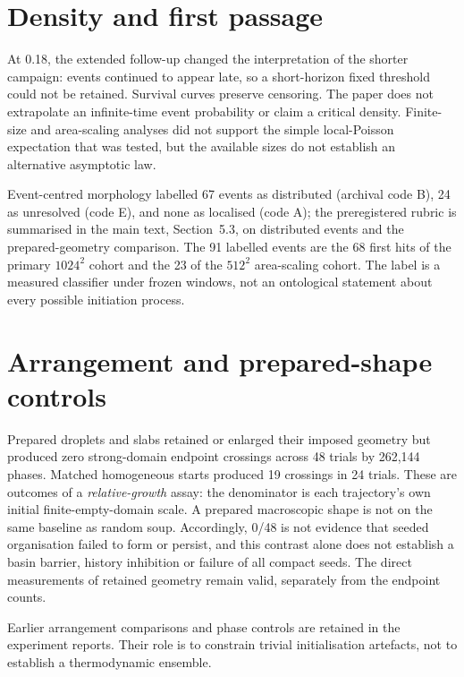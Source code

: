 \documentclass[11pt,a4paper]{article}
\begin{document}
\section{Density and first passage}
\begin{table}[h]
\centering
\caption{Frozen finite-ensemble first-passage summary.}

\end{table}

At 0.18, the extended follow-up changed the interpretation of the shorter campaign: events continued to appear late, so a short-horizon fixed threshold could not be retained. Survival curves preserve censoring. The paper does not extrapolate an infinite-time event probability or claim a critical density. Finite-size and area-scaling analyses did not support the simple local-Poisson expectation that was tested, but the available sizes do not establish an alternative asymptotic law.

Event-centred morphology labelled 67 events as distributed (archival code B), 24 as unresolved (code E), and none as localised (code A); the preregistered rubric is summarised in the main text, Section~5.3, on distributed events and the prepared-geometry comparison. The 91 labelled events are the 68 first hits of the primary $1024^2$ cohort and the 23 of the $512^2$ area-scaling cohort. The label is a measured classifier under frozen windows, not an ontological statement about every possible initiation process.

\section{Arrangement and prepared-shape controls}
Prepared droplets and slabs retained or enlarged their imposed geometry but produced zero strong-domain endpoint crossings across 48 trials by 262,144 phases. Matched homogeneous starts produced 19 crossings in 24 trials. These are outcomes of a \emph{relative-growth} assay: the denominator is each trajectory's own initial finite-empty-domain scale. A prepared macroscopic shape is not on the same baseline as random soup. Accordingly, 0/48 is not evidence that seeded organisation failed to form or persist, and this contrast alone does not establish a basin barrier, history inhibition or failure of all compact seeds. The direct measurements of retained geometry remain valid, separately from the endpoint counts.

Earlier arrangement comparisons and phase controls are retained in the experiment reports. Their role is to constrain trivial initialisation artefacts, not to establish a thermodynamic ensemble.
\end{document}
